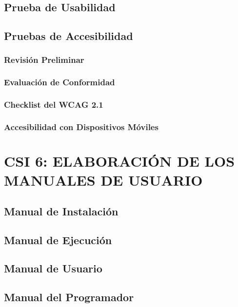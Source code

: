\documentclass[11pt]{report}
\begin{document}
\subsection{Prueba de Usabilidad}

\subsection{Pruebas de Accesibilidad} 
 
\subsubsection{Revisión Preliminar} 

\subsubsection{Evaluación de Conformidad} 

\subsubsection{Checklist del WCAG 2.1} 

\subsubsection{Accesibilidad con Dispositivos Móviles} 


\newpage
\section{CSI 6: ELABORACIÓN DE LOS MANUALES DE USUARIO}

\subsection{Manual de Instalación} 

\subsection{Manual de Ejecución} 

\subsection{Manual de Usuario} 

\subsection{Manual del Programador}
\end{document}
